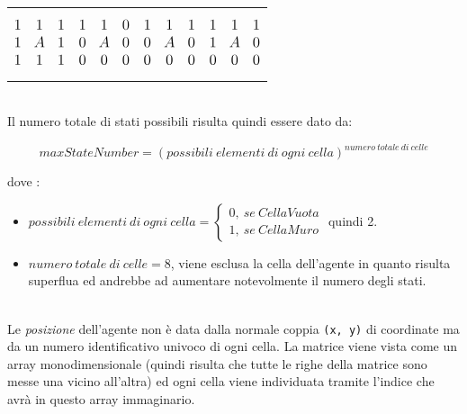 \begin{tabular}{m{8em} m{10em} m{10em} m{8em}}
	\begin{equation*}
		\large
		\begin{matrix}
			1 & 1 & 1\\
			1 & A & 1\\
			1 & 1 & 1 \\
		\end{matrix}
	\end{equation*}
	&
	\begin{equation*}
		\large
		\begin{matrix}
			1 & 1 & 0\\
			0 & A & 0\\
			0 & 0 & 0 \\
		\end{matrix}
	\end{equation*}
	&
	\begin{equation*}
		\large
		\begin{matrix}
			1 & 1 & 1\\
			0 & A & 0\\
			0 & 0 & 0 \\
		\end{matrix}
	\end{equation*}
	&
	\begin{equation*}
		\large
		\begin{matrix}
			1 & 1 & 1\\
			1 & A & 0\\
			0 & 0 & 0 \\
		\end{matrix}
	\end{equation*}
\end{tabular}
\ \\
Il numero totale di stati possibili risulta quindi essere dato da:

\[ maxStateNumber = (possibili \ elementi \ di \ ogni \ cella)^{numero \ totale \ di \ celle}\]

dove :
\begin{itemize}
	\item $possibili \ elementi \ di \ ogni \ cella = \begin{cases}
		0, \ se \ Cella Vuota \\
		1, \ se \ Cella Muro
	\end{cases}$  quindi 2.
	\item $numero \ totale \ di \ celle = 8$, viene esclusa la cella dell'agente in quanto risulta superflua ed andrebbe ad aumentare notevolmente il numero degli stati.
\end{itemize}
\ \\
Le \textit{posizione} dell'agente non \`{e} data dalla normale coppia \lstinline[style=cmd]|(x, y)| di coordinate ma da un numero identificativo univoco di ogni cella. La matrice viene vista come un array monodimensionale (quindi risulta che tutte le righe della matrice sono messe una vicino all'altra) ed ogni cella viene individuata tramite l'indice che avr\`{a} in questo array immaginario.

